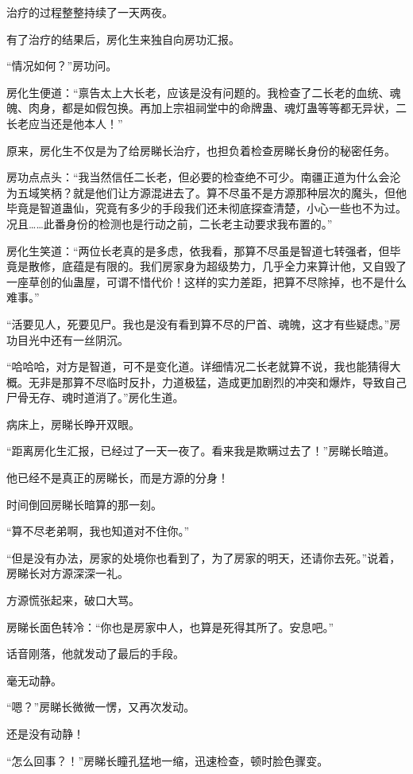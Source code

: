 \begin{this_body}
治疗的过程整整持续了一天两夜。

有了治疗的结果后，房化生来独自向房功汇报。

“情况如何？”房功问。

房化生便道：“禀告太上大长老，应该是没有问题的。我检查了二长老的血统、魂魄、肉身，都是如假包换。再加上宗祖祠堂中的命牌蛊、魂灯蛊等等都无异状，二长老应当还是他本人！”

原来，房化生不仅是为了给房睇长治疗，也担负着检查房睇长身份的秘密任务。

房功点点头：“我当然信任二长老，但必要的检查绝不可少。南疆正道为什么会沦为五域笑柄？就是他们让方源混进去了。算不尽虽不是方源那种层次的魔头，但他毕竟是智道蛊仙，究竟有多少的手段我们还未彻底探查清楚，小心一些也不为过。况且……此番身份的检测也是行动之前，二长老主动要求我布置的。”

房化生笑道：“两位长老真的是多虑，依我看，那算不尽虽是智道七转强者，但毕竟是散修，底蕴是有限的。我们房家身为超级势力，几乎全力来算计他，又自毁了一座草创的仙蛊屋，可谓不惜代价！这样的实力差距，把算不尽除掉，也不是什么难事。”

“活要见人，死要见尸。我也是没有看到算不尽的尸首、魂魄，这才有些疑虑。”房功目光中还有一丝阴沉。

“哈哈哈，对方是智道，可不是变化道。详细情况二长老就算不说，我也能猜得大概。无非是那算不尽临时反扑，力道极猛，造成更加剧烈的冲突和爆炸，导致自己尸骨无存、魂时道消了。”房化生道。

病床上，房睇长睁开双眼。

“距离房化生汇报，已经过了一天一夜了。看来我是欺瞒过去了！”房睇长暗道。

他已经不是真正的房睇长，而是方源的分身！

时间倒回房睇长暗算的那一刻。

“算不尽老弟啊，我也知道对不住你。”

“但是没有办法，房家的处境你也看到了，为了房家的明天，还请你去死。”说着，房睇长对方源深深一礼。

方源慌张起来，破口大骂。

房睇长面色转冷：“你也是房家中人，也算是死得其所了。安息吧。”

话音刚落，他就发动了最后的手段。

毫无动静。

“嗯？”房睇长微微一愣，又再次发动。

还是没有动静！

“怎么回事？！”房睇长瞳孔猛地一缩，迅速检查，顿时脸色骤变。


\end{this_body}
